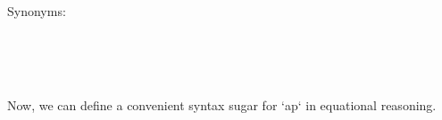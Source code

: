 Synonyms:

\begin{code}%
\>[0]%
\>[6]\AgdaSymbol{=}\AgdaSpace{}%
\<%
\\
\>[0]\AgdaSpace{}%
\AgdaSymbol{=}\AgdaSpace{}%
\<%
\\
%
\\[\AgdaEmptyExtraSkip]%
\>[0]\AgdaSpace{}%
\AgdaSpace{}%
\AgdaSpace{}%
\AgdaSpace{}%
\AgdaSymbol{=}\AgdaSpace{}%
\AgdaSpace{}%
\AgdaFunction{[[}\AgdaSpace{}%
\AgdaSpace{}%
\AgdaFunction{]]}\<%
\end{code}

Now, we can define a convenient syntax sugar for `ap` in
equational reasoning.

\begin{code}%
\>[0]\AgdaSpace{}%
\AgdaSpace{}%
\<%
\\
\>[0]\AgdaSpace{}%
\AgdaSpace{}%
\AgdaSpace{}%
\AgdaSpace{}%
\AgdaSymbol{=}\AgdaSpace{}%
\AgdaSpace{}%
\AgdaSpace{}%
\<%
\end{code}

